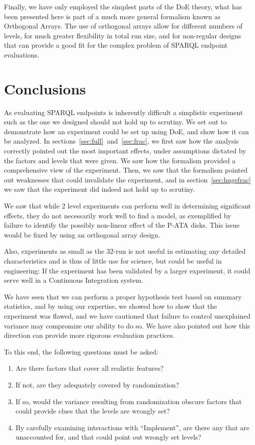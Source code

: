 \documentclass{llncs}
\begin{document}
Finally, we have only employed the simplest parts of the DoE
theory, what has been presented here is part of a much more general
formalism known as Orthogonal Arrays. The use of orthogonal arrays
allow for different numbers of levels, for much greater flexibility in
total run size, and for non-regular designs that can provide a good fit
for the complex problem of SPARQL endpoint evaluations. 

\section{Conclusions}

As evaluating SPARQL endpoints is inherently difficult a simplistic
experiment such as the one we designed should not hold up to
scrutiny. We set out to demonstrate how an experiment could be set up
using DoE, and show how it can be analyzed. In
sections~\ref{sec:full}~and~\ref{sec:frac}, we first saw how the
analysis correctly pointed out the most important effects, under
assumptions dictated by the factors and levels that were given. We saw
how the formalism provided a comprehensive view of the
experiment. Then, we saw that the formalism pointed out weaknesses
that could invalidate the experiment, and in
section~\ref{sec:hugefrac} we saw that the experiment did indeed not
hold up to scrutiny.

We saw that while 2 level experiments can perform well in determining
significant effects, they do not necessarily work well to find a
model, as exemplified by failure to identify the possibly non-linear
effect of the P-ATA disks. This issue would be fixed by using an
orthogonal array design.

Also, experiments as small as the 32-run is not useful in estimating
any detailed characteristics and is thus of little use for science,
but could be useful in engineering: If the experiment has been
validated by a larger experiment, it could serve well in a Continuous
Integration system.

We have seen that we can perform a proper hypothesis test based on
summary statistics, and by using our expertise, we showed how to show
that the experiment was flawed, and we have cautioned that failure to
control unexplained variance may compromize our ability to do so. We
have also pointed out how this direction can provide more rigorous
evaluation practices.

To this end, the following questions must be asked:
\begin{enumerate}
\item Are there factors that cover all realistic features?
\item If not, are they adequately covered by randomization?
\item If so, would the variance resulting from randomization obscure
  factors that could provide clues that the levels are wrongly set?
\item By carefully examining interactions with ``Implement'', are
  there any that are unaccounted for, and that could point out wrongly
  set levels?
\end{enumerate}
\end{document}

